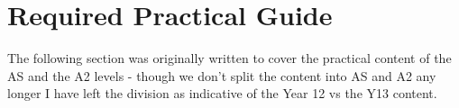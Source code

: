 \section{Required Practical Guide}

The following section was originally written to cover the practical content of the AS and the A2 levels - though we don't split the content into AS and A2 any longer I have left the division as indicative of the Year 12 vs the Y13 content.

